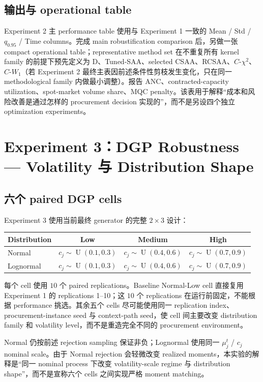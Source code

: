 \documentclass[11pt,a4paper]{ctexart}
\newcommand{\U}{\operatorname{U}}
\begin{document}
\subsection{输出与 operational table}

Experiment 2 主 performance table 使用与 Experiment 1 一致的 Mean / Std / $q_{0.95}$ / Time columns。完成 main robustification comparison 后，另做一张 compact operational table；representative method set 在不重复所有 kernel family 的前提下预先定义为 D、Tuned-SAA、selected CSAA、RCSAA、$C$-$\chi^2$、$C$-$W_1$（若 Experiment 2 最终主表因前述条件性剪枝发生变化，只在同一 methodological family 内做最小调整）。报告 ANC、contracted-capacity utilization、spot-market volume share、MQC penalty。该表用于解释“成本和风险改善是通过怎样的 procurement decision 实现的”，而不是另设四个独立 optimization experiments。

\section{Experiment 3：DGP Robustness --- Volatility 与 Distribution Shape}

\subsection{六个 paired DGP cells}

Experiment 3 使用当前最终 generator 的完整 $2\times3$ 设计：
\begin{center}
\begin{tabular}{lccc}
\toprule
Distribution & Low & Medium & High\\
\midrule
Normal & $c_j\sim\U(0.1,0.3)$ & $c_j\sim\U(0.4,0.6)$ & $c_j\sim\U(0.7,0.9)$\\
Lognormal & $c_j\sim\U(0.1,0.3)$ & $c_j\sim\U(0.4,0.6)$ & $c_j\sim\U(0.7,0.9)$\\
\bottomrule
\end{tabular}
\end{center}
每个 cell 使用 $10$ 个 paired replications。Baseline Normal-Low cell 直接复用 Experiment 1 的 replications 1--10；这 $10$ 个 replications 在运行前固定，不能根据 performance 挑选。其余五个 cells 尽可能使用同一 replication index、procurement-instance seed 与 context-path seed，使 cell 间主要改变 distribution family 和 volatility level，而不是重造完全不同的 procurement environment。

Normal 仍按前述 rejection sampling 保证非负；Lognormal 使用同一 $\mu_j^t$ / $c_j$ nominal scale。由于 Normal rejection 会轻微改变 realized moments，本实验的解释是“同一 nominal process 下改变 volatility-scale regime 与 distribution shape”，而不是宣称六个 cells 之间实现严格 moment matching。
\end{document}
